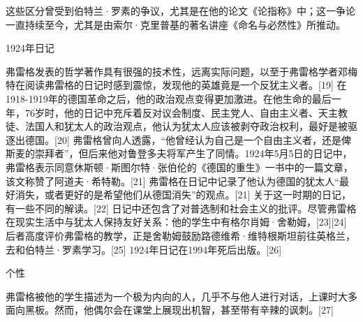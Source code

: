 这些区分曾受到伯特兰·罗素的争议，尤其是在他的论文《论指称》中；这一争论一直持续至今，尤其是由索尔·克里普基的著名讲座《命名与必然性》所推动。

1924年日记

弗雷格发表的哲学著作具有很强的技术性，远离实际问题，以至于弗雷格学者邓梅特在阅读弗雷格的日记时感到震惊，发现他的英雄竟是一个反犹主义者。[19] 在1918-1919年的德国革命之后，他的政治观点变得更加激进。在他生命的最后一年，76岁时，他的日记中充斥着反对议会制度、民主党人、自由主义者、天主教徒、法国人和犹太人的政治观点，他认为犹太人应该被剥夺政治权利，最好是被驱逐出德国。[20] 弗雷格曾向人透露，“他曾经认为自己是一个自由主义者，还是俾斯麦的崇拜者”，但后来他对鲁登多夫将军产生了同情。1924年5月5日的日记中，弗雷格表示同意休斯顿·斯图尔特·张伯伦的《德国的重生》一书中的一篇文章，该文称赞了阿道夫·希特勒。[21] 弗雷格在日记中记录了他认为德国的犹太人“最好消失，或者更好的是希望他们从德国消失”的观点。[21] 关于这一时期的日记，有一些不同的解读。[22] 日记中还包含了对普选制和社会主义的批评。尽管弗雷格在现实生活中与犹太人保持友好关系：他的学生中有格尔肖姆·舍勒姆，[23][24] 后者高度评价弗雷格的教学，正是舍勒姆鼓励路德维希·维特根斯坦前往英格兰，去和伯特兰·罗素学习。[25] 1924年日记在1994年死后出版。[26]

个性

弗雷格被他的学生描述为一个极为内向的人，几乎不与他人进行对话，上课时大多面向黑板。然而，他偶尔会在课堂上展现出机智，甚至带有辛辣的讽刺。[27]